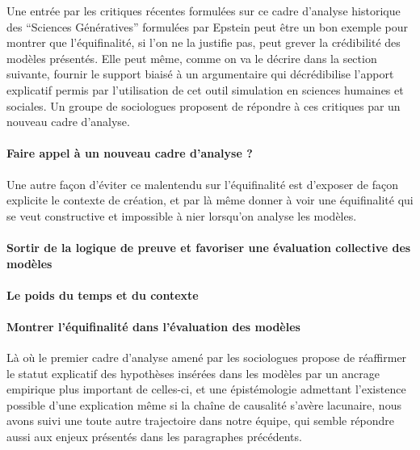 Une entrée par les critiques récentes formulées sur ce cadre d'analyse historique des \enquote{Sciences Génératives} formulées par Epstein peut être un bon exemple pour montrer que l'équifinalité, si l'on ne la justifie pas, peut grever la crédibilité des modèles présentés. Elle peut même, comme on va le décrire dans la section suivante, fournir le support biaisé à un argumentaire qui décrédibilise l'apport explicatif permis par l'utilisation de cet outil simulation en sciences humaines et sociales. Un groupe de sociologues proposent de répondre à ces critiques par un nouveau cadre d'analyse.

\paragraph{Faire appel à un nouveau cadre d'analyse ?}
\label{p:cadre_analyse}


Une autre façon d'éviter ce malentendu sur l'équifinalité est d'exposer de façon explicite le contexte de création, et par là même donner à voir une équifinalité qui se veut constructive et impossible à nier lorsqu'on analyse les modèles.

\paragraph{Sortir de la logique de preuve et favoriser une évaluation collective des modèles}
\label{p:preuve}



\paragraph{Le poids du temps et du contexte }
\label{p:poids}



\paragraph{Montrer l'équifinalité dans l'évaluation des modèles}
\label{p:nvlle_equifinalite}

Là où le premier cadre d'analyse amené par les sociologues propose de réaffirmer le statut explicatif des hypothèses insérées dans les modèles par un ancrage empirique plus important de celles-ci, et une épistémologie admettant l'existence possible d'une explication même si la chaîne de causalité s'avère lacunaire, nous avons suivi une toute autre trajectoire dans notre équipe, qui semble répondre aussi aux enjeux présentés dans les paragraphes précédents.

